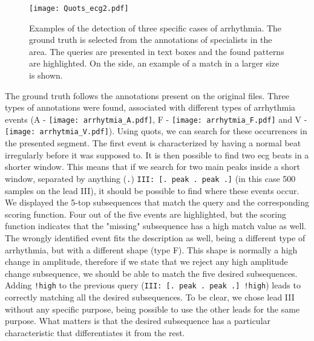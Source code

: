 \begin{figure}
\texttt{[image: Quots\_ecg2.pdf]}
\caption{Examples of the detection of three specific cases of arrhythmia. The ground truth is selected from the annotations of specialists in the area. The queries are presented in text boxes and the found patterns are highlighted. On the side, an example of a match in a larger size is shown.}
\label{fig:ecg_use_case2}
\end{figure}

The ground truth follows the annotations present on the original files. Three types of annotations were found, associated with different types of arrhythmia events (A - \texttt{[image: arrhytmia\_A.pdf]}, F - \texttt{[image: arrhytmia\_F.pdf]} and V - \texttt{[image: arrhytmia\_V.pdf]}). Using \gls{quots}, we can search for these occurrences in the presented segment. The first event is characterized by having a normal beat irregularly before it was supposed to. It is then possible to find two \gls{ecg} beats in a shorter window. This means that if we search for two main peaks inside a short window, separated by anything (\texttt{.}) \texttt{III: [. peak . peak .]} (in this case 500 samples on the lead III), it should be possible to find where these events occur. We displayed the 5-top subsequences that match the query and the corresponding scoring function. Four out of the five events are highlighted, but the scoring function indicates that the "missing" subsequence has a high match value as well. The wrongly identified event fits the description as well, being a different type of arrhythmia, but with a different shape (type F). This shape is normally a high change in amplitude, therefore if we state that we reject any high amplitude change subsequence, we should be able to match the five desired subsequences. Adding \texttt{!high} to the previous query (\texttt{III: [. peak . peak .] !high}) leads to correctly matching all the desired subsequences. To be clear, we chose lead III without any specific purpose, being possible to use the other leads for the same purpose. What matters is that the desired subsequence has a particular characteristic that differentiates it from the rest.
\par
